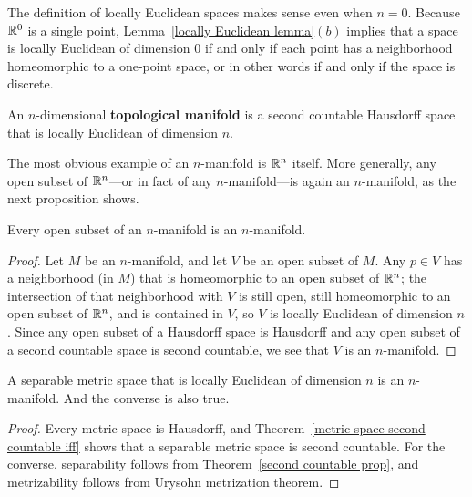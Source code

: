 The definition of locally Euclidean spaces makes sense even when $n=0$. Because $\mathbb{R}^0$ is a single point, Lemma~\ref{locally Euclidean lemma}$(b)$ implies that a space is locally Euclidean of dimension $0$ if and only if each point has a neighborhood homeomorphic to a one-point space, or in other words if and only if the space is discrete.
\begin{definition}
An $n$-dimensional \textbf{topological manifold} is a second countable Hausdorff space that is locally Euclidean of dimension $n$.
\end{definition}
The most obvious example of an $n$-manifold is $\mathbb{R}^n$ itself. More generally, any open subset of $\mathbb{R}^n$---or in fact of any $n$-manifold---is again an $n$-manifold, as the next proposition shows.
\begin{proposition}
Every open subset of an $n$-manifold is an $n$-manifold.
\end{proposition}
\begin{proof}
Let $M$ be an $n$-manifold, and let $V$ be an open subset of $M$. Any $p\in V$ has a neighborhood (in $M$) that is homeomorphic to an open subset of $\mathbb{R}^n$; the intersection of that neighborhood with $V$ is still open, still homeomorphic to an open subset of $\mathbb{R}^n$, and is contained in $V$, so $V$ is locally Euclidean of dimension $n$. Since any open subset of a Hausdorff space is Hausdorff and any open subset of a second countable space is second countable, we see that $V$ is an $n$-manifold.
\end{proof}
\begin{theorem}
A separable metric space that is locally Euclidean of dimension $n$ is an $n$-manifold. And the converse is also true.
\end{theorem}
\begin{proof}
Every metric space is Hausdorff, and Theorem~\ref{metric space second countable iff} shows that a separable metric space is second countable. For the converse, separability follows from Theorem~\ref{second countable prop}, and metrizability follows from Urysohn metrization theorem.
\end{proof}
